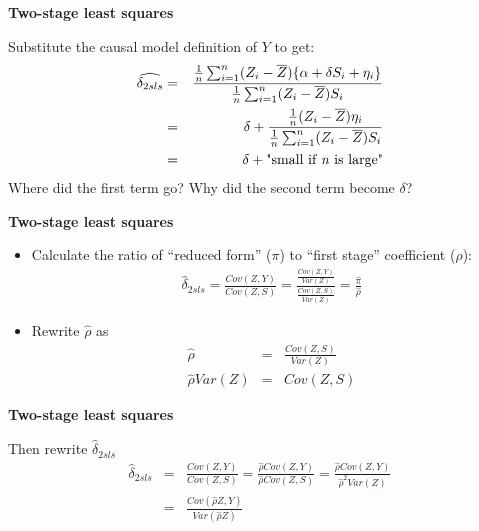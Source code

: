 \documentclass[notes=show]{beamer}
\begin{document}
\begin{frame}[plain]
\begin{center}
\textbf{Two-stage least squares}
\end{center}

Substitute the causal model definition of $Y$ to get:
		\begin{eqnarray*}
		\widehat{\delta_{2sls} }&=& \frac{ \frac{1}{n} \sum_{i=1}^n (Z_i -\overline{Z})\{ \alpha + \delta{S}_i + \eta_i \}}{\frac{1}{n} \sum_{i=1}^n (Z_i - \overline{Z})S_i} \\
		&=& \delta + \frac{\frac{1}{n} (Z_i - \overline{Z})\eta_i}{\frac{1}{n}\sum_{i=1}^n(Z_i - \overline{Z})S_i} \\
		&=& \delta + \text{"small if \emph{n} is large"}
		\end{eqnarray*}Where did the first term go? Why did the second term become $\delta$?

\end{frame}	

\begin{frame}[plain]

	\begin{center}
	\textbf{Two-stage least squares}
	\end{center}

	\begin{itemize}

	\item Calculate the ratio of ``reduced form'' ($\pi$) to ``first stage'' coefficient ($\rho$):
		\begin{eqnarray*}
		\widehat{\delta}_{2sls} = \frac{ Cov(Z,Y)} {Cov(Z,S)} = \frac{ \frac{Cov(Z,Y)}{Var(Z)}}{ \frac{Cov(Z,S)}{Var(Z)}} = \frac{\widehat{\pi}}{\widehat{\rho}}
		\end{eqnarray*}
	\item Rewrite $\widehat{\rho}$ as\begin{eqnarray*}
	\widehat{\rho} &=&  \frac{Cov(Z,S)}{Var(Z)} \\
\widehat{\rho}Var(Z)	&=& Cov(Z,S) 
	\end{eqnarray*}
	\end{itemize}

\end{frame}


\begin{frame}[plain]
\begin{center}
\textbf{Two-stage least squares}
\end{center}

Then rewrite $\widehat{\delta}_{2sls}$
	\begin{eqnarray*}
	\widehat{\delta}_{2sls} &=& \frac{ Cov(Z,Y)}{ Cov(Z,S)} = \frac{\widehat{\rho}Cov(Z,Y)}{\widehat{\rho}Cov(Z,S)}= \frac{\widehat{\rho}Cov(Z,Y)}{\widehat{\rho}^2Var(Z)} \nonumber \\
	&=& \frac{Cov(\widehat{\rho}Z,Y)}{Var(\widehat{\rho}Z)} 
	\end{eqnarray*}


\end{frame}
\end{document}
